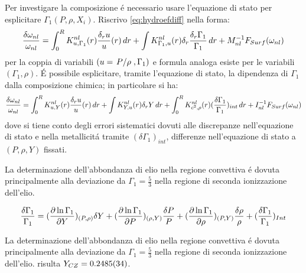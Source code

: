 \documentclass[../main.tex]{subfiles}
\begin{document}
Per investigare la composizione \'e necessario usare l'equazione di stato per esplicitare $\Gamma_1(P,\rho,X_i)$. Riscrivo \eqref{eq:hydroefdiff} nella forma:
\begin{equation}
\frac{\delta\omega_{nl}}{\omega_{nl}}=\int_0^RK^{nl}_{u,\Gamma_1}(r)\frac{\delta_ru}{u}(r)\,dr+\int K^{nl}_{\Gamma_1,u}(r)\delta_r\frac{\delta_r\Gamma_1}{\Gamma_1}\,dr+M_{nl}\expy{-1}F_{Surf}(\omega_{nl})\label{eq:invdGammadrho}
\end{equation}
per la coppia di variabili $(u=\midfrac{P}{\rho},\Gamma_1)$ e formula analoga esiste per le variabili $(\Gamma_1,\rho)$.
\'E possibile esplicitare, tramite l'equazione di stato, la dipendenza di $\Gamma_1$ dalla composizione chimica; in particolare si ha:
\begin{equation}
\frac{\delta\omega_{nl}}{\omega_{nl}}=\int_0^RK^{nl}_{u,Y}(r)\frac{\delta_ru}{u}(r)\,dr+\int K^{nl}_{Y,u}(r)\delta_rY\,dr+\int_0^RK^{nl}_{c^2,\rho}(r)(\frac{\delta\Gamma_1}{\Gamma_1})_{int}\,dr+I_{nl}\expy{-1}F_{Surf}(\omega_{nl})\label{eq:diffthermo}
\end{equation}
dove si tiene conto degli errori sistematici dovuti alle discrepanze nell'equazione di stato e nella metallicit\'a tramite $(\delta\Gamma_1)_{int}$, differenze nell'equazione di stato a $(P,\rho,Y)$ fissati.

La determinazione dell'abbondanza di elio nella regione convettiva \'e dovuta principalmente alla deviazione da $\Gamma_1=\frac{5}{3}$ nella regione di seconda ionizzazione dell'elio.

\begin{workout}

\begin{equation}
\frac{\delta\Gamma_1}{\Gamma_1}=(\PDy{Y}{\ln{\Gamma_1}})_{(P,\rho)}\delta Y+(\PDy{P}{\ln{\Gamma_1}})_{(\rho,Y)}\frac{\delta P}{P}+(\PDy{\rho}{\ln{\Gamma_1}})_{(P,Y)}\frac{\delta\rho}{\rho}+(\frac{\delta\Gamma_1}{\Gamma_1})_{Int}
\end{equation}

\end{workout}

\begin{workout}

\end{workout}

\begin{workout}
La determinazione dell'abbondanza di elio nella regione convettiva \'e dovuta principalmente alla deviazione da $\Gamma_1=\frac{5}{3}$ nella regione di seconda ionizzazione dell'elio.
risulta $Y_{CZ}=\num{0.2485+-0.0034}$.
\end{workout}
\end{document}
